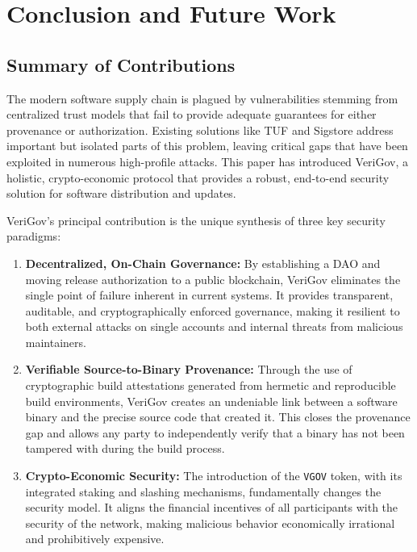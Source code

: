 \documentclass{article}
\begin{document}
\section{Conclusion and Future Work}
\label{sec:conclusion-and-future-work}

\subsection{Summary of Contributions}

The modern software supply chain is plagued by vulnerabilities stemming from centralized trust models that fail to provide adequate guarantees for either provenance or authorization. Existing solutions like TUF and Sigstore address important but isolated parts of this problem, leaving critical gaps that have been exploited in numerous high-profile attacks. This paper has introduced VeriGov, a holistic, crypto-economic protocol that provides a robust, end-to-end security solution for software distribution and updates.

VeriGov's principal contribution is the unique synthesis of three key security paradigms:

\begin{enumerate}
\item \textbf{Decentralized, On-Chain Governance:} By establishing a DAO and moving release authorization to a public blockchain, VeriGov eliminates the single point of failure inherent in current systems. It provides transparent, auditable, and cryptographically enforced governance, making it resilient to both external attacks on single accounts and internal threats from malicious maintainers.~\cite{wright2015decentralized}
\item \textbf{Verifiable Source-to-Binary Provenance:} Through the use of cryptographic build attestations generated from hermetic and reproducible build environments, VeriGov creates an undeniable link between a software binary and the precise source code that created it. This closes the provenance gap and allows any party to independently verify that a binary has not been tampered with during the build process.~\cite{slsa}
\item \textbf{Crypto-Economic Security:} The introduction of the \lstinline{VGOV} token, with its integrated staking and slashing mechanisms, fundamentally changes the security model. It aligns the financial incentives of all participants with the security of the network, making malicious behavior economically irrational and prohibitively expensive.~\cite{buterin2017casper}
\end{enumerate}
\end{document}
